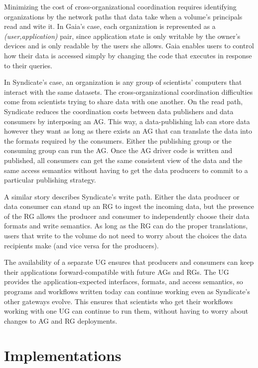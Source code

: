 Minimizing the cost of cross-organizational coordination requires identifying
organizations by the network paths that data take when a volume's principals
read and wite it.  In Gaia's case, each organization is represented as a
\textit{(user,application)} pair, since
application state is only writable by the owner's devices and is only readable
by the users she allows.  Gaia enables users to control how their
data is accessed simply by changing the code that executes in response to their queries.

In Syndicate's case, an organization is any group of scientists' computers
that interact with the same datasets.  The cross-organizational coordination
difficulties come from scientists trying to share data with one another.
On the read path, Syndicate reduces the coordination costs between data publishers and data consumers by
interposing an AG.  This way, a data-publishing lab can store data however
they want as long as there exists an AG that can translate the data into the
formats required by the consumers.  Either the publishing group or the consuming
group can run the AG.  Once the AG driver code is written and published,
all consumers can get the same consistent view of the data and the same access
semantics without having to get the data producers to commit to a particular
publishing strategy.

A similar story describes Syndicate's write path.  Either the data producer or data
consumer can stand up an RG to ingest the incoming data, but the presence of the
RG allows the producer and consumer to independently choose their data formats
and write semantics.  As long as the RG can do the proper translations, users
that write to the volume do not need to worry about the choices the data
recipients make (and vice versa for the producers).

The availability of a separate UG ensures that producers and consumers can keep
their applications forward-compatible with future AGs and RGs.  The UG provides
the application-expected interfaces, formats, and access semantics, so
programs and workflows written today can continue working even as Syndicate's
other gateways evolve.  This ensures that scientists who get their workflows
working with one UG can continue to run them, without having to worry about
changes to AG and RG deployments.

\section{Implementations}

